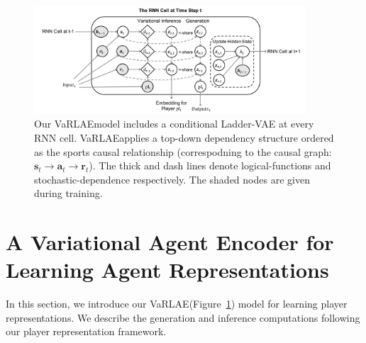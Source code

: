 \documentclass[letterpaper]{article} %
\newcommand{\latentvariables}{\mathbf{z}}
\newcommand{\state}{\mathbf{s}}
\newcommand{\action}{\mathbf{a}}
\newcommand{\reward}{\boldsymbol{r}}
\newcommand{\system}{VaRLAE\;}
\begin{document}

\begin{figure}[!htbp]
    \centering
    \includegraphics[width=0.9\textwidth]{figures/clvrnn-graph.pdf}
    \caption{Our \system model includes a conditional Ladder-VAE at every RNN cell. \system applies a top-down dependency structure
    ordered as the sports causal relationship (correspodning to the causal graph: $\state_{t}\rightarrow \action_{t}\rightarrow\reward_{t}$).
    The thick and dash lines denote logical-functions  and stochastic-dependence respectively. The shaded nodes are given during training.
    }
    \label{fig:varlae-graphical-model}
    \vspace{-0.1in}
\end{figure}
\section{A Variational Agent Encoder for Learning Agent Representations}
In this section, we introduce our \system(Figure~\ref{fig:varlae-graphical-model}) model for learning player representations. 
We describe the generation and inference computations 
following our player representation framework.
\end{document}
